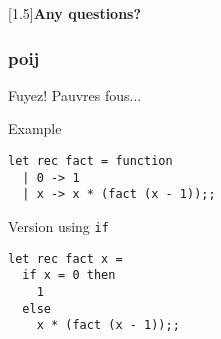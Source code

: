 \documentclass{beamer}
\begin{document}
\begin{frame}
  \nocite{*}
  
  
\end{frame}

\begin{standoutframe}
  \begin{center}
    \scalebox{1.5}[1.5]{\Huge \bfseries Any questions?}
  \end{center}
\end{standoutframe}

\begin{frame}[fragile]
  \frametitle{poij}
  \begin{alertblock}{Fuyez!}
    Pauvres fous...
  \end{alertblock}
  \begin{exampleblock}{Example}
\begin{verbatim}
let rec fact = function
  | 0 -> 1
  | x -> x * (fact (x - 1));;
\end{verbatim}
  \end{exampleblock}
  \begin{block}{Version using \texttt{if}}
 \begin{verbatim}
let rec fact x =
  if x = 0 then
    1
  else
    x * (fact (x - 1));;
\end{verbatim}
  \end{block}
\end{frame}
\end{document}
